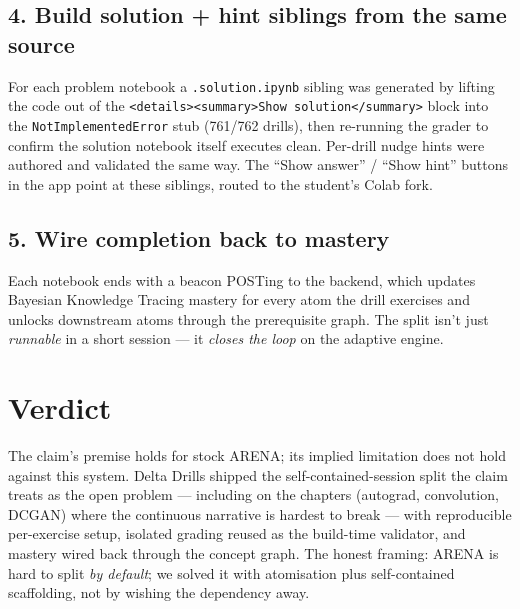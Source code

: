 \documentclass[11pt]{article}
\begin{document}
\subsection*{4. Build solution + hint siblings from the same source}
For each problem notebook a \texttt{.solution.ipynb} sibling was generated by lifting the code
out of the \verb|<details><summary>Show solution</summary>| block into the
\texttt{NotImplementedError} stub (761/762 drills), then re-running the grader to confirm the
solution notebook itself executes clean. Per-drill nudge hints were authored and validated the
same way. The ``Show answer'' / ``Show hint'' buttons in the app point at these siblings,
routed to the student's Colab fork.

\subsection*{5. Wire completion back to mastery}
Each notebook ends with a beacon POSTing to the backend, which updates Bayesian Knowledge
Tracing mastery for every atom the drill exercises and unlocks downstream atoms through the
prerequisite graph. The split isn't just \emph{runnable} in a short session --- it
\emph{closes the loop} on the adaptive engine.

\section*{Verdict}

The claim's premise holds for stock ARENA; its implied limitation does not hold against this
system. Delta Drills shipped the self-contained-session split the claim treats as the open
problem --- including on the chapters (autograd, convolution, DCGAN) where the continuous
narrative is hardest to break --- with reproducible per-exercise setup, isolated grading reused
as the build-time validator, and mastery wired back through the concept graph. The honest
framing: ARENA is hard to split \emph{by default}; we solved it with atomisation plus
self-contained scaffolding, not by wishing the dependency away.
\end{document}
